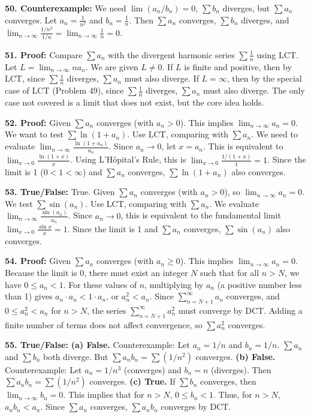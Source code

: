 \documentclass{article}
\begin{document}
\textbf{50. Counterexample:} We need \(\lim (a_n/b_n) = 0\), \(\sum b_n\) diverges, but \(\sum a_n\) converges. Let \(a_n = \frac{1}{n^2}\) and \(b_n = \frac{1}{n}\). Then \(\sum a_n\) converges, \(\sum b_n\) diverges, and \(\lim_{n \to \infty} \frac{1/n^2}{1/n} = \lim_{n \to \infty} \frac{1}{n} = 0\).

\textbf{51. Proof:} Compare \(\sum a_n\) with the divergent harmonic series \(\sum \frac{1}{n}\) using LCT. Let \(L = \lim_{n \to \infty} n a_n\). We are given \(L \ne 0\). If \(L\) is finite and positive, then by LCT, since \(\sum \frac{1}{n}\) diverges, \(\sum a_n\) must also diverge. If \(L = \infty\), then by the special case of LCT (Problem 49), since \(\sum \frac{1}{n}\) diverges, \(\sum a_n\) must also diverge. The only case not covered is a limit that does not exist, but the core idea holds.

\textbf{52. Proof:} Given \(\sum a_n\) converges (with \(a_n > 0\)). This implies \(\lim_{n \to \infty} a_n = 0\). We want to test \(\sum \ln(1+a_n)\). Use LCT, comparing with \(\sum a_n\). We need to evaluate \(\lim_{n \to \infty} \frac{\ln(1+a_n)}{a_n}\). Since \(a_n \to 0\), let \(x=a_n\). This is equivalent to \(\lim_{x \to 0} \frac{\ln(1+x)}{x}\). Using L'Hôpital's Rule, this is \(\lim_{x \to 0} \frac{1/(1+x)}{1} = 1\). Since the limit is 1 (\(0<1<\infty\)) and \(\sum a_n\) converges, \(\sum \ln(1+a_n)\) also converges.

\textbf{53. True/False:} True. Given \(\sum a_n\) converges (with \(a_n > 0\)), so \(\lim_{n \to \infty} a_n = 0\). We test \(\sum \sin(a_n)\). Use LCT, comparing with \(\sum a_n\). We evaluate \(\lim_{n \to \infty} \frac{\sin(a_n)}{a_n}\). Since \(a_n \to 0\), this is equivalent to the fundamental limit \(\lim_{x \to 0} \frac{\sin x}{x} = 1\). Since the limit is 1 and \(\sum a_n\) converges, \(\sum \sin(a_n)\) also converges.

\textbf{54. Proof:} Given \(\sum a_n\) converges (with \(a_n \ge 0\)). This implies \(\lim_{n \to \infty} a_n = 0\). Because the limit is 0, there must exist an integer \(N\) such that for all \(n > N\), we have \(0 \le a_n < 1\). For these values of \(n\), multiplying by \(a_n\) (a positive number less than 1) gives \(a_n \cdot a_n < 1 \cdot a_n\), or \(a_n^2 < a_n\). Since \(\sum_{n=N+1}^\infty a_n\) converges, and \(0 \le a_n^2 < a_n\) for \(n>N\), the series \(\sum_{n=N+1}^\infty a_n^2\) must converge by DCT. Adding a finite number of terms does not affect convergence, so \(\sum a_n^2\) converges.

\textbf{55. True/False:}
\textbf{(a) False.} Counterexample: Let \(a_n = 1/n\) and \(b_n = 1/n\). \(\sum a_n\) and \(\sum b_n\) both diverge. But \(\sum a_n b_n = \sum (1/n^2)\) converges.
\textbf{(b) False.} Counterexample: Let \(a_n = 1/n^3\) (converges) and \(b_n = n\) (diverges). Then \(\sum a_n b_n = \sum (1/n^2)\) converges.
\textbf{(c) True.} If \(\sum b_n\) converges, then \(\lim_{n \to \infty} b_n = 0\). This implies that for \(n > N\), \(0 \le b_n < 1\). Thus, for \(n>N\), \(a_n b_n < a_n\). Since \(\sum a_n\) converges, \(\sum a_n b_n\) converges by DCT.
\end{document}
